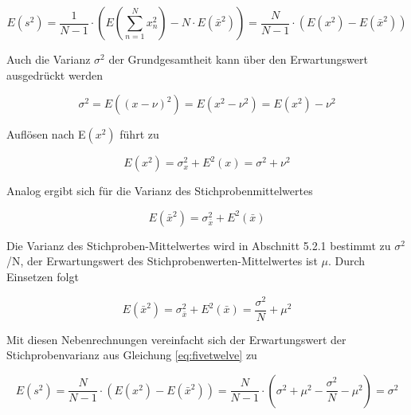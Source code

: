 \begin{equation}\label{eq:fivetwelve}
E\left(s^{2} \right)=\dfrac{1}{N-1} \cdot \left(E\left(\sum _{n=1}^{N}x_{n}^{2}  \right)-N\cdot E\left(\bar{x}^{2} \right)\right)=\dfrac{N}{N-1} \cdot \left(E\left(x^{2} \right)-E\left(\bar{x}^{2} \right)\right)
\end{equation}

\noindent Auch die Varianz $\sigma^{2}$ der Grundgesamtheit kann \"{u}ber den Erwartungswert ausgedr\"{u}ckt werden

\begin{equation}\label{eq:fivethirteen}
\sigma^{2}=E\left((x-\nu)^{2} \right) = E\left (x^{2}-\nu^{2}\right) = E\left (x^{2}\right) - \nu^{2}
\end{equation}

\noindent Auflösen nach E$\left (x^{2} \right)$ führt zu

\begin{equation}\label{eq:fivefourteen}
E\left (x^{2}\right) = \sigma_{x}^{2} + E^{2}(x) = \sigma^{2} + \nu^{2}
\end{equation}

\noindent Analog ergibt sich für die Varianz des Stichprobenmittelwertes

\begin{equation}\label{eq:fivefifteen}
E\left(\bar{x}^{2} \right)=\sigma _{\bar{x}}^{2} +E^{2} \left(\bar{x}\right)
\end{equation}

\noindent Die Varianz des Stichproben-Mittelwertes wird in Abschnitt 5.2.1 bestimmt zu $\sigma^{2}$/N, der Erwartungswert des Stichprobenwerten-Mittelwertes ist $\mu$. Durch Einsetzen folgt

\begin{equation}\label{eq:fivesixteen}
E\left(\bar{x}^{2} \right)=\sigma _{\bar{x}}^{2} +E^{2} \left(\bar{x}\right)=\dfrac{\sigma ^{2} }{N} +\mu ^{2}
\end{equation}

\noindent Mit diesen Nebenrechnungen vereinfacht sich der Erwartungswert der Stichprobenvarianz aus Gleichung \eqref{eq:fivetwelve} zu

\begin{equation}\label{eq:fiveseventeen}
E\left(s^{2} \right)=\dfrac{N}{N-1} \cdot \left(E\left(x^{2} \right)-E\left(\bar{x}^{2} \right)\right)=\dfrac{N}{N-1} \cdot \left(\sigma ^{2} +\mu ^{2} -\dfrac{\sigma ^{2} }{N} -\mu ^{2} \right)=\sigma ^{2}
\end{equation}

